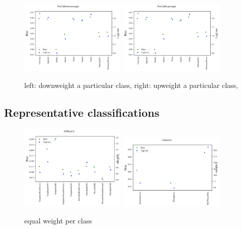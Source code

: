 \begin{figure}
	\begin{center}
		\includegraphics[width=0.45\textwidth]{./fig/multi_metric_down.png}
		\includegraphics[width=0.45\textwidth]{./fig/multi_metric_up.png}
		\caption{left: downweight a particular class, right: upweight a particular class, }
		\label{fig:plasticc_down_vs_up_random}
	\end{center}
\end{figure}


\subsection{Representative classifications}
\label{sec:realresults}

\begin{figure}
	\begin{center}
		\includegraphics[width=0.45\textwidth]{./fig/SNPhotCC_res.png}
		\includegraphics[width=0.45\textwidth]{./fig/Unknown_res.png}
		\caption{equal weight per class}
		\label{fig:real_metric_compare}
	\end{center}
\end{figure}

